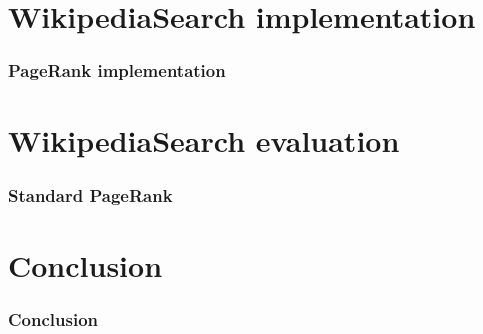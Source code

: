 \documentclass{beamer}
\begin{document}
	\section{WikipediaSearch implementation}
	
	\begin{frame}
		\frametitle{PageRank implementation}
	\end{frame}

	\section{WikipediaSearch evaluation}
	
	\begin{frame}
		\frametitle{Standard PageRank}
	\end{frame}
	
	\section{Conclusion}
		
	\begin{frame}
		\frametitle{Conclusion}
	\end{frame}
	
\end{document}
